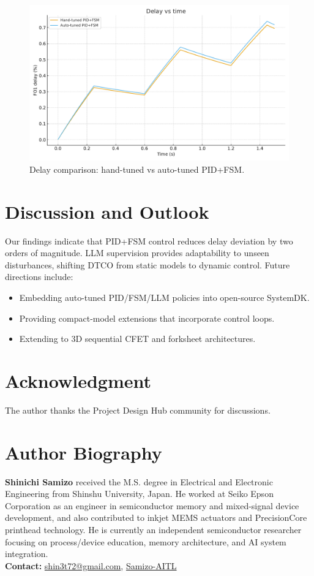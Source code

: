 \documentclass[conference]{IEEEtran}
\begin{document}
\begin{figure}[h]
\centering
\includegraphics[width=0.9\columnwidth]{figs/delay_compare.pdf}
\caption{Delay comparison: hand-tuned vs auto-tuned PID+FSM.}
\label{fig:delay}
\end{figure}

\section{Discussion and Outlook}
Our findings indicate that PID+FSM control reduces delay deviation
by two orders of magnitude. LLM supervision provides adaptability to
unseen disturbances, shifting DTCO from static models to dynamic control.
Future directions include:
\begin{itemize}
  \item Embedding auto-tuned PID/FSM/LLM policies into open-source SystemDK.
  \item Providing compact-model extensions that incorporate control loops.
  \item Extending to 3D sequential CFET and forksheet architectures.
\end{itemize}

\section*{Acknowledgment}
The author thanks the Project Design Hub community for discussions.




\section*{Author Biography}
\noindent\textbf{Shinichi Samizo}
received the M.S. degree in Electrical and Electronic Engineering from Shinshu University, Japan.
He worked at Seiko Epson Corporation as an engineer in semiconductor memory and mixed-signal device development,
and also contributed to inkjet MEMS actuators and PrecisionCore printhead technology.
He is currently an independent semiconductor researcher focusing on process/device education,
memory architecture, and AI system integration.\\[2pt]
\textbf{Contact:} \href{mailto:shin3t72@gmail.com}{shin3t72@gmail.com}, 
\href{https://github.com/Samizo-AITL}{Samizo-AITL}
\end{document}
